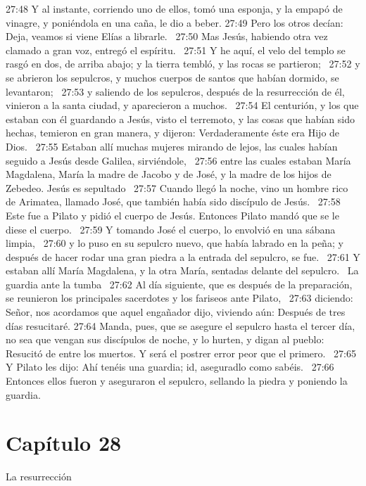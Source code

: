 27:48 Y al instante, corriendo uno de ellos, tomó una esponja, y la empapó de vinagre, y poniéndola en una caña, le dio a beber. 
27:49 Pero los otros decían: Deja, veamos si viene Elías a librarle.  
27:50 Mas Jesús, habiendo otra vez clamado a gran voz, entregó el espíritu.  
27:51 Y he aquí, el velo del templo se rasgó en dos, de arriba abajo; y la tierra tembló, y las rocas se partieron;  
27:52 y se abrieron los sepulcros, y muchos cuerpos de santos que habían dormido, se levantaron;  
27:53 y saliendo de los sepulcros, después de la resurrección de él, vinieron a la santa ciudad, y aparecieron a muchos.  
27:54 El centurión, y los que estaban con él guardando a Jesús, visto el terremoto, y las cosas que habían sido hechas, temieron en gran manera, y dijeron: Verdaderamente éste era Hijo de Dios.  
27:55 Estaban allí muchas mujeres mirando de lejos, las cuales habían seguido a Jesús desde Galilea, sirviéndole,  
27:56 entre las cuales estaban María Magdalena, María la madre de Jacobo y de José, y la madre de los hijos de Zebedeo. 
Jesús es sepultado   
27:57 Cuando llegó la noche, vino un hombre rico de Arimatea, llamado José, que también había sido discípulo de Jesús.  
27:58 Este fue a Pilato y pidió el cuerpo de Jesús. Entonces Pilato mandó que se le diese el cuerpo.  
27:59 Y tomando José el cuerpo, lo envolvió en una sábana limpia,  
27:60 y lo puso en su sepulcro nuevo, que había labrado en la peña; y después de hacer rodar una gran piedra a la entrada del sepulcro, se fue.  
27:61 Y estaban allí María Magdalena, y la otra María, sentadas delante del sepulcro.  
La guardia ante la tumba  
27:62 Al día siguiente, que es después de la preparación, se reunieron los principales sacerdotes y los fariseos ante Pilato,  
27:63 diciendo: Señor, nos acordamos que aquel engañador dijo, viviendo aún: Después de tres días resucitaré. 
27:64 Manda, pues, que se asegure el sepulcro hasta el tercer día, no sea que vengan sus discípulos de noche, y lo hurten, y digan al pueblo: Resucitó de entre los muertos. Y será el postrer error peor que el primero.  
27:65 Y Pilato les dijo: Ahí tenéis una guardia; id, aseguradlo como sabéis.  
27:66 Entonces ellos fueron y aseguraron el sepulcro, sellando la piedra y poniendo la guardia.  
\section*{Capítulo 28}
La resurrección  
 

